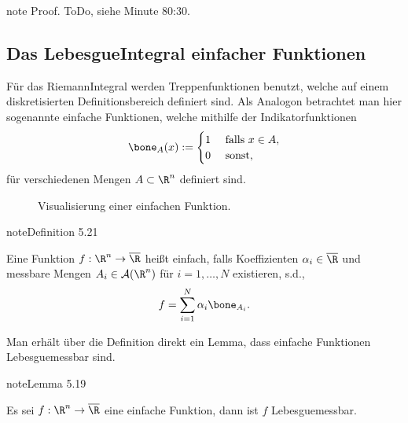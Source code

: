 \documentclass[letterpaper,10pt,german]{jupyterBook}
\let\sphinxpxdimen\pdfpxdimen\else\newdimen\sphinxpxdimen
\begin{document}
\begin{sphinxadmonition}{note}
\sphinxAtStartPar
Proof. ToDo, siehe  Minute 80:30.
\end{sphinxadmonition}


\subsection{Das Lebesgue\sphinxhyphen{}Integral einfacher Funktionen}
\label{\detokenize{masstheorie/lebesgue_integral:das-lebesgue-integral-einfacher-funktionen}}
\sphinxAtStartPar
Für das Riemann\sphinxhyphen{}Integral werden Treppenfunktionen benutzt, welche auf einem diskretisierten Definitionsbereich definiert sind. Als Analogon betrachtet man hier sogenannte einfache Funktionen, welche mithilfe der Indikatorfunktionen
\begin{equation*}
\begin{split}\bone_A(x):=
\begin{cases}
1&\text{ falls }x\in A,\\
0&\text{ sonst,}
\end{cases}\end{split}
\end{equation*}
\sphinxAtStartPar
für verschiedenen Mengen \(A\subset \R^n\) definiert sind.

\begin{figure}[htbp]
\centering
\capstart

\noindent\sphinxincludegraphics[width=400\sphinxpxdimen]{{simplefun}.jpg}
\caption{Visualisierung einer einfachen Funktion.}\label{\detokenize{masstheorie/lebesgue_integral:fig-simplefun}}\end{figure}
\label{masstheorie/lebesgue_integral:definition-8}
\begin{sphinxadmonition}{note}{Definition 5.21}



\sphinxAtStartPar
Eine Funktion \(f:\R^n\to\overline{\R}\) heißt einfach, falls Koeffizienten \(\alpha_i\in\overline{\R}\) und messbare Mengen \(A_i\in\mathcal{A}(\R^n)\) für \(i=1,\ldots,N\) existieren, s.d.,
\begin{equation*}
\begin{split}f = \sum_{i=1}^N \alpha_i \bone_{A_i}.\end{split}
\end{equation*}\end{sphinxadmonition}

\sphinxAtStartPar
Man erhält über die Definition direkt ein Lemma, dass einfache Funktionen Lebesgue\sphinxhyphen{}messbar sind.
\label{masstheorie/lebesgue_integral:lemma-9}
\begin{sphinxadmonition}{note}{Lemma 5.19}



\sphinxAtStartPar
Es sei \(f:\R^n\to\overline{\R}\) eine einfache Funktion, dann ist \(f\) Lebesgue\sphinxhyphen{}messbar.
\end{sphinxadmonition}
\end{document}

